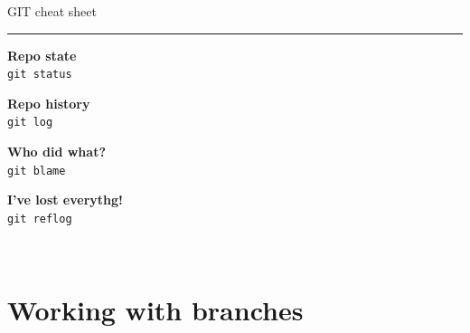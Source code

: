 \documentclass[compress]{beamer}
\begin{document}
\begin{frame}{GIT cheat sheet}
\begin{multicols}{2}
    \rule{\columnwidth}{0.2pt}

    \begin{multicols}{2}
    {\bf Repo state}\\
    \texttt{git status}\par

    {\bf Repo history}\\
    \texttt{git log}\par

    {\bf Who did what?}\\
    \texttt{git blame}\par

    {\bf I've lost everythg!}\\
    \texttt{git reflog}\par


    \end{multicols}

    ~\\

    \end{multicols}

\end{frame}


\section{Working with branches}
\end{document}
